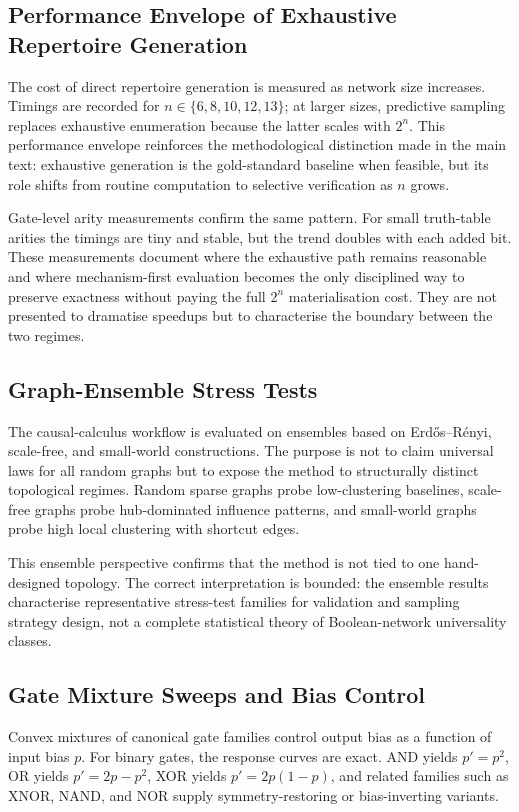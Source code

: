 \documentclass[11pt]{article}
\theoremstyle{definition}
\begin{document}
\subsection{Performance Envelope of Exhaustive Repertoire Generation}
The cost of direct repertoire generation is measured as network size increases. Timings are recorded for \(n\in\{6,8,10,12,13\}\); at larger sizes, predictive sampling replaces exhaustive enumeration because the latter scales with \(2^n\). This performance envelope reinforces the methodological distinction made in the main text: exhaustive generation is the gold-standard baseline when feasible, but its role shifts from routine computation to selective verification as \(n\) grows.

Gate-level arity measurements confirm the same pattern. For small truth-table arities the timings are tiny and stable, but the trend doubles with each added bit. These measurements document where the exhaustive path remains reasonable and where mechanism-first evaluation becomes the only disciplined way to preserve exactness without paying the full \(2^n\) materialisation cost. They are not presented to dramatise speedups but to characterise the boundary between the two regimes.

\subsection{Graph-Ensemble Stress Tests}
The causal-calculus workflow is evaluated on ensembles based on Erd\H{o}s--R\'enyi, scale-free, and small-world constructions. The purpose is not to claim universal laws for all random graphs but to expose the method to structurally distinct topological regimes. Random sparse graphs probe low-clustering baselines, scale-free graphs probe hub-dominated influence patterns, and small-world graphs probe high local clustering with shortcut edges.

This ensemble perspective confirms that the method is not tied to one hand-designed topology. The correct interpretation is bounded: the ensemble results characterise representative stress-test families for validation and sampling strategy design, not a complete statistical theory of Boolean-network universality classes.

\subsection{Gate Mixture Sweeps and Bias Control}
Convex mixtures of canonical gate families control output bias as a function of input bias \(p\). For binary gates, the response curves are exact. AND yields \(p'=p^2\), OR yields \(p'=2p-p^2\), XOR yields \(p'=2p(1-p)\), and related families such as XNOR, NAND, and NOR supply symmetry-restoring or bias-inverting variants.
\end{document}
